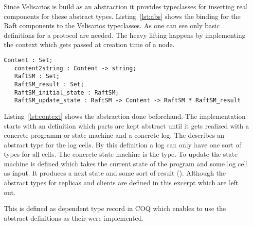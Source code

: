 Since Velisarios is build as an abstraction it provides typeclasses
for inserting real components for these abstract types. Listing~\ref{lst:abs}
shows the binding for the Raft components to the Velisarios typeclasses.
As one can see only basic definitions for a protocol are needed.
The heavy lifting happens by implementing the context which
gets passed at creation time of a node.


\begin{lstlisting}[style=coq,label=lst:context,
caption=Excerpt of the context definition of types and functions used within
the protocol.]
   Content : Set;
   content2string : Content -> string;
   RaftSM : Set;
   RaftSM_result : Set;
   RaftSM_initial_state : RaftSM;
   RaftSM_update_state : RaftSM -> Content -> RaftSM * RaftSM_result
\end{lstlisting}

Listing~\ref{lst:context} shows the abstraction done beforehand. The
implementation starts with an definition which parts are kept abstract
until it gets realized with a concrete programm or state machine and
a concrete log. The  describes an abstract type for the log
cells. By this definition a log can only have one sort of types for all cells.
The concrete state machine is the  type. To update the state
machine  is defined which takes the current
state of the program and some log cell as input. It produces a next
state and some sort of result (). Although the abstract
types for replicas and clients are defined in this excerpt which are left out. 

This is defined as dependent type record in COQ which enables to use the
abstract definitions as their were implemented. 



